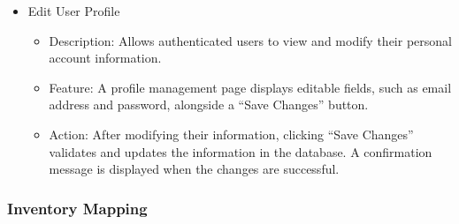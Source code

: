 \documentclass[conference]{IEEEtran}
\begin{document}
\begin{itemize}
    \item Edit User Profile
    \begin{itemize}
        \item Description: Allows authenticated users to view and modify their personal account information.
        \item Feature: A profile management page displays editable fields, such as email address and password, alongside a ``Save Changes'' button.
        \item Action: After modifying their information, clicking ``Save Changes'' validates and updates the information in the database. A confirmation message is displayed when the changes are successful.
    \end{itemize}
\end{itemize}

\subsubsection{Inventory Mapping}
\end{document}
